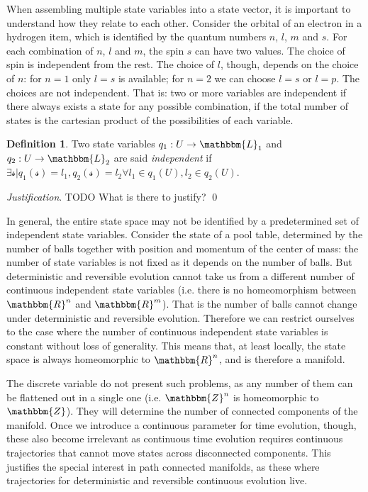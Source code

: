 \documentclass[aps,pra,10pt,twocolumn,floatfix,nofootinbib]{revtex4-1}
\theoremstyle{definition}
\newtheorem{defn}[prop]{Definition}
\newenvironment{justification}{\emph{Justification}.}{\qed}
\begin{document}
When assembling multiple state variables into a state vector, it is important to understand how they relate to each other. Consider the orbital of an electron in a hydrogen item, which is identified by the quantum numbers $n$, $l$, $m$ and $s$. For each combination of $n$, $l$ and $m$, the spin $s$ can have two values. The choice of spin is independent from the rest. The choice of $l$, though, depends on the choice of $n$: for $n=1$ only $l=s$ is available; for $n=2$ we can choose $l=s$ or $l=p$. The choices are not independent. That is: two or more variables are independent if there always exists a state for any possible combination, if the total number of states is the cartesian product of the possibilities of each variable.

\begin{defn}\label{independent_state_variables}
	Two state variables $q_1 : U \rightarrow \mathbbm{L}_1$ and $q_2 : U \rightarrow \mathbbm{L}_2$ are said \emph{independent} if $\exists \mathcal{s} | q_1(\mathcal{s})=l_1, q_2(\mathcal{s})=l_2 \forall l_1 \in q_1(U), l_2 \in q_2(U)$.
\end{defn}

\begin{justification}
	TODO What is there to justify?
\end{justification}

In general, the entire state space may not be identified by a predetermined set of independent state variables. Consider the state of a pool table, determined by the number of balls together with position and momentum of the center of mass: the number of state variables is not fixed as it depends on the number of balls. But deterministic and reversible evolution cannot take us from a different number of continuous independent state variables (i.e. there is no homeomorphism between $\mathbbm{R}^n$ and $\mathbbm{R}^m$). That is the number of balls cannot change under deterministic and reversible evolution. Therefore we can restrict ourselves to the case where the number of continuous independent state variables is constant without loss of generality. This means that, at least locally, the state space is always homeomorphic to $\mathbbm{R}^n$, and is therefore a manifold.

The discrete variable do not present such problems, as any number of them can be flattened out in a single one (i.e. $\mathbbm{Z}^n$ is homeomorphic to $\mathbbm{Z}$). They will determine the number of connected components of the manifold. Once we introduce a continuous parameter for time evolution, though, these also become irrelevant as continuous time evolution requires continuous trajectories that cannot move states across disconnected components. This justifies the special interest in path connected manifolds, as these where trajectories for deterministic and reversible continuous evolution live.
\end{document}
